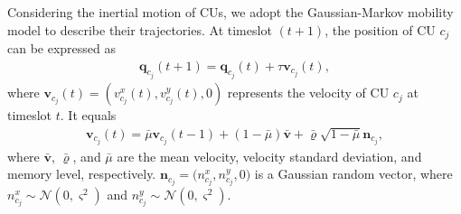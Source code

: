 \documentclass[10pt,journal,compsoc]{IEEEtran}
\begin{document}
Considering the inertial motion of CUs, we adopt the Gaussian-Markov mobility model to describe their trajectories\cite{System model: CUs-mobility}. 
At timeslot $(t + 1)$, the position of CU $c_{j}$ can be expressed as
\begin{align}
    \bm{q}_{c_{j}}(t + 1) = \bm{q}_{c_{j}}(t) + \tau\bm{v}_{c_{j}}(t),
\end{align}
where $\bm{v}_{c_{j}}(t) = \left(v^{x}_{c_{j}}(t), v^{y}_{c_{j}}(t), 0\right)$ represents the velocity of CU $c_{j}$ at timeslot $t$. It equals
\begin{align}
    \bm{v}_{c_{j}}(t) = \bar{\mu}\bm{v}_{c_{j}}(t - 1) + \left(1 - \bar{\mu}\right)\bar{\bm{v}} + \bar{\varrho}\sqrt{1 - \bar{\mu}}\bm{n}_{c_{j}},
\end{align}
where  $\bar{\bm{v}}$, $\bar{\varrho}$, and $\bar{\mu}$ are the mean velocity, velocity standard deviation, and memory level, respectively.
$\bm{n}_{c_{j}} = \big({n}^{x}_{c_{j}}, {n}^{y}_{c_{j}}, 0\big)$ is a Gaussian random vector, where ${n}^{x}_{c_{j}} \sim \mathcal{N}\left(0, \varsigma^{2}\right)$ and ${n}^{y}_{c_{j}} \sim \mathcal{N}\left(0, \varsigma^{2}\right)$.
\end{document}
